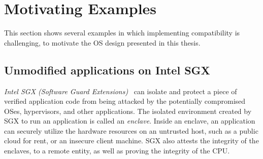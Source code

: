 \begin{comment}
\item
We identify the suboptimal lookup latency in \emph{Linux file system directory cache}
~\cite{tsai15dcache}.
This heavily engineered OS component
optimizes looking up paths in file systems,
yet the searching in the directory cache is closely interleaved
with permission checks against security models,
and file system features such as resolving symbolic links.
We optimize the lookup hit latency by decoupling cache searching
from other operations.
We cache the result of permission checks on path prefixes in a data structure
called prefix check cache,
which will be invalidated when permission changes.
The hit latency of {\tt stat} system calls on a long path
can be optimized to up to 27\%,
improving the execution time
for Dovecot IMAP server by up to 12\%
and GIT version control system by up to 25\%.


\end{compactitem}
\end{comment}


\section{Motivating Examples}

This section shows several examples in which implementing compatibility is challenging, to motivate the OS design presented in this thesis.


\subsection{Unmodified applications on Intel SGX}

{\em Intel SGX (Software Guard Extensions)}~\cite{intelsgx}
can isolate and protect a piece of verified application code from being attacked by the potentially compromised OSes, hypervisors, and other applications.
The isolated environment created by SGX to run an application is called an {\em enclave}. Inside an enclave, an application can securely utilize the hardware resources on an untrusted host,
such as a public cloud for rent, or an insecure client machine.
SGX also attests the integrity of the enclaves, to a remote entity, as well as proving the integrity of the CPU.


